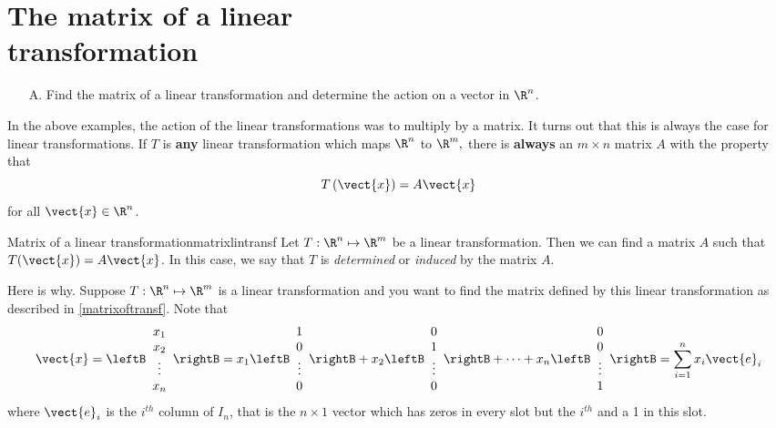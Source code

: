 \section{The matrix of a linear \texorpdfstring{\\}{ } transformation}

\begin{outcome}
\begin{enumerate}
\item[A.]  Find the matrix of a linear transformation and determine the action on a vector in $\R^n$.   
\end{enumerate}
\end{outcome}

In the above examples, the action of the linear transformations was to multiply by a matrix. 
It turns out that this is always the case for linear transformations.
If $T$ is \textbf{any} linear transformation which maps $\R^{n}$ to 
$\R^{m},$ there is \textbf{always} an $m\times n$ matrix $A$ with the
property that
\begin{equation}
T\left(\vect{x}\right) = A\vect{x} \label{matrixoftransf}
\end{equation}
for all $\vect{x} \in \R^{n}$.

\begin{theorem}{Matrix of a linear transformation}{matrixlintransf}
Let $T:\R^{n}\mapsto \R^{m}$ be a linear transformation. Then we can find a matrix $A$ such that $T(\vect{x}) = A\vect{x}$. 
 In this case, we say that $T$ is {\em determined\em} or {\em induced\em}
by the matrix $A$.
\end{theorem}

Here is why. Suppose $T:\R^{n}\mapsto \R^{m}$ is a linear transformation and you want to find
the matrix defined by this linear transformation as described in \ref{matrixoftransf}.
 Note that
\begin{equation*}
\vect{x} =\leftB
\begin{array}{c}
x_{1} \\
x_{2} \\
\vdots \\
x_{n}
\end{array}
\rightB = x_{1}\leftB
\begin{array}{c}
1 \\
0 \\
\vdots \\
0
\end{array}
\rightB + x_{2}\leftB
\begin{array}{c}
0 \\
1 \\
\vdots \\
0
\end{array}
\rightB +\cdots + x_{n}\leftB
\begin{array}{c}
0 \\
0 \\
\vdots \\
1
\end{array}
\rightB = \sum_{i=1}^{n}x_{i}\vect{e}_{i}
\end{equation*}
where $\vect{e}_{i}$ is the $i^{th}$ column of $I_n$, that is the $n \times
1$ vector which has zeros in every slot but the $i^{th}$ and a 1 in
this slot.

